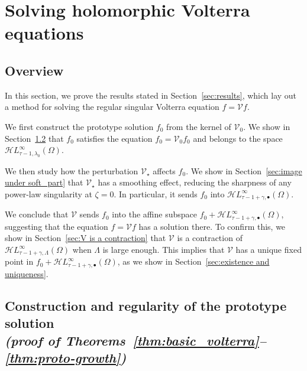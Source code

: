 \documentclass[final]{siamart220329}
\newcommand{\singexp}[2]{\mathcal{H}L^\infty_{#1, #2}}
\newcommand{\singexpalg}[1]{\singexp{#1}{\bullet}}
\newcommand{\volterra}{\mathcal{V}}
\newcommand{\hardpart}{\mathcal{V}_0}
\newcommand{\softpart}{\mathcal{V}_\star}
\newcommand{\solwhole}{f}
\newcommand{\solproto}{f_0}
\newcommand{\domain}{\Omega}
\begin{document}
\section{Solving holomorphic Volterra equations}\label{sec:proof_main_results}
\subsection{Overview}
In this section, we prove the results stated in Section~\ref{sec:results}, which lay out a method for solving the regular singular Volterra equation $\solwhole = \volterra \solwhole$.

We first construct the prototype solution $\solproto$ from the kernel of $\hardpart$. We show in Section~\ref{sec:proto-construction-regularity} that $\solproto$ satisfies the equation $\solproto = \hardpart \solproto$ and belongs to the space $\singexp{\tau-1}{\lambda_0}(\domain)$.

We then study how the perturbation $\softpart$ affects $\solproto$. We show in Section~\ref{sec:image under soft_part} that $\softpart$ has a smoothing effect, reducing the sharpness of any power-law singularity at $\zeta = 0$. In particular, it sends $\solproto$ into $\singexpalg{\tau-1+\gamma}(\domain)$.

We conclude that $\volterra$ sends $\solproto$ into the affine subspace $\solproto + \singexpalg{\tau-1+\gamma}(\domain)$, suggesting that the equation $\solwhole = \volterra \solwhole$ has a solution there. To confirm this, we show in Section~\ref{sec:V is a contraction} that $\volterra$ is a contraction of $\singexp{\tau-1+\gamma}{\Lambda}(\domain)$ when $\Lambda$ is large enough. This implies that $\volterra$ has a unique fixed point in $\solproto + \singexpalg{\tau-1+\gamma}(\domain)$, as we show in Section~\ref{sec:existence and uniqueness}.
\subsection{Construction and regularity of the prototype solution \\ \textit{(proof of Theorems~\ref{thm:basic_volterra}--\ref{thm:proto-growth})}}\label{sec:proto-construction-regularity}
\end{document}
